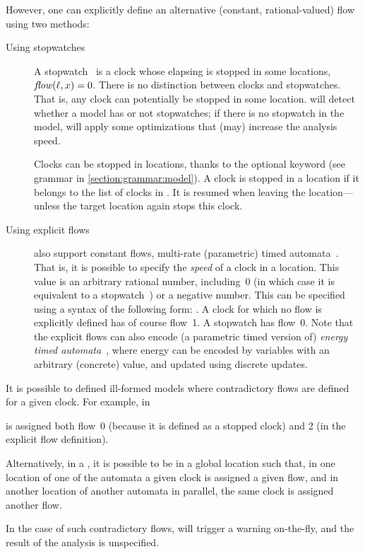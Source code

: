 However, one can explicitly define an alternative (constant, rational-valued) flow using two methods:
\begin{description}
	\item [Using stopwatches]
A stopwatch~\cite{CL00} is a clock whose elapsing is stopped in some locations, \ie{} $\mathit{flow}(\ell, x) = 0$.
There is no distinction between clocks and stopwatches.
That is, any clock can potentially be stopped in some location.
\imitator{} will detect whether a model has or not stopwatches; if there is no stopwatch in the model, \imitator{} will apply some optimizations that (may) increase the analysis speed.

Clocks can be stopped in locations, thanks to the optional  keyword (see grammar in  \cref{section:grammar:model}).
A clock is stopped in a location if it belongs to the list of clocks in .
It is resumed when leaving the location---unless the target location again stops this clock.

\item [Using explicit flows]
\imitator{} also support constant flows, \ie{} multi-rate (parametric) timed automata~\cite{ACHHHNOSY95}.
That is, it is possible to specify the \emph{speed} of a clock in a location.
This value is an arbitrary rational number, including~0 (in which case it is equivalent to a stopwatch~\cite{CL00}) or a negative number.
This can be specified using a syntax of the following form: .
A clock for which no flow is explicitly defined has of course flow~1.
A stopwatch has flow~0.
Note that the explicit flows can also encode (a parametric timed version of) \emph{energy timed automata}~\cite{BFLMS08}, where energy can be encoded by \imitator{} variables with an arbitrary (concrete) value, and updated using discrete updates.
\end{description}



\begin{remark}
	It is possible to defined ill-formed models where contradictory flows are defined for a given clock.
	For example, in


	\noindent
	 is assigned both flow~0 (because it is defined as a stopped clock) and 2 (in the explicit flow definition).

	Alternatively, in a \NIPTA{}, it is possible to be in a global location such that, in one location of one of the automata a given clock is assigned a given flow, and in another location of another automata in parallel, the same clock is assigned another flow.

	In the case of such contradictory flows, \imitator{} will trigger a warning on-the-fly, and the result of the analysis is unspecified.
\end{remark}



